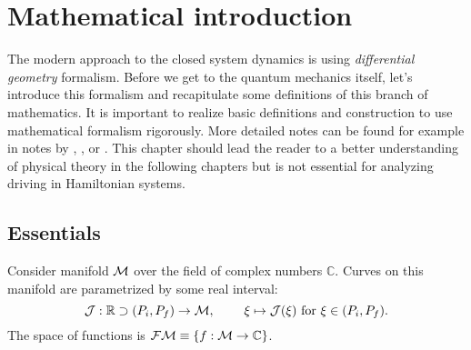\chapter{Mathematical introduction}
\label{chap:mathIntro}
The modern approach to the closed system dynamics is using \emph{differential geometry} formalism. Before we get to the quantum mechanics itself, let's introduce this formalism and recapitulate some definitions of this branch of mathematics. It is important to realize basic definitions and construction to use mathematical formalism rigorously. More detailed notes can be found for example in notes by \citet{krtous}, \citet{lu}, or \citet{fecko}. This chapter should lead the reader to a better understanding of physical theory in the following chapters but is not essential for analyzing driving in Hamiltonian systems.
\section{Essentials}
Consider manifold $\mathcal{M}$ over the field of complex numbers $\mathbb C$. Curves on this manifold are parametrized by some real interval:
$$\mathcal J:\mathbb{R} \supset (P_i,P_f) \rightarrow \mathcal{M},\; \qquad \xi\mapsto \mathcal J(\xi) \text{  for } \xi \in (P_i,P_f) .$$ 
The space of functions is $\mathcal{FM}\equiv\{f:\mathcal{M}\rightarrow \mathbb{C}\}$.


